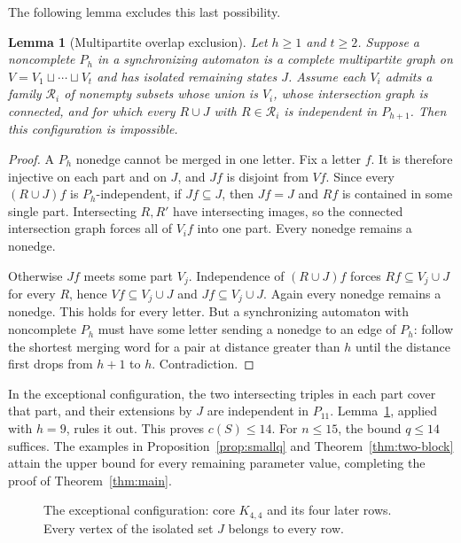 \documentclass[11pt]{article}
\newtheorem{lemma}[theorem]{Lemma}
\theoremstyle{definition}
\theoremstyle{plain}
\begin{document}
The following lemma excludes this last possibility.
\begin{lemma}[Multipartite overlap exclusion]\label{lem:multipartite}
Let $h\ge1$ and $t\ge2$. Suppose a noncomplete $P_h$ in a synchronizing automaton is a complete multipartite graph on $V=V_1\sqcup\cdots\sqcup V_t$ and has isolated remaining states $J$. Assume each $V_i$ admits a family $\mathcal R_i$ of nonempty subsets whose union is $V_i$, whose intersection graph is connected, and for which every $R\cup J$ with $R\in\mathcal R_i$ is independent in $P_{h+1}$. Then this configuration is impossible.
\end{lemma}
\begin{proof}
A $P_h$ nonedge cannot be merged in one letter. Fix a letter $f$. It is therefore injective on each part and on $J$, and $Jf$ is disjoint from $Vf$. Since every $(R\cup J)f$ is $P_h$-independent, if $Jf\subseteq J$, then $Jf=J$ and $Rf$ is contained in some single part. Intersecting $R,R'$ have intersecting images, so the connected intersection graph forces all of $V_if$ into one part. Every nonedge remains a nonedge.

Otherwise $Jf$ meets some part $V_j$. Independence of $(R\cup J)f$ forces $Rf\subseteq V_j\cup J$ for every $R$, hence $Vf\subseteq V_j\cup J$ and $Jf\subseteq V_j\cup J$. Again every nonedge remains a nonedge. This holds for every letter. But a synchronizing automaton with noncomplete $P_h$ must have some letter sending a nonedge to an edge of $P_h$: follow the shortest merging word for a pair at distance greater than $h$ until the distance first drops from $h+1$ to $h$. Contradiction.
\end{proof}

In the exceptional configuration, the two intersecting triples in each
part cover that part, and their extensions by $J$ are independent in
$P_{11}$. Lemma~\ref{lem:multipartite}, applied with $h=9$, rules it out.
This proves $c(S)\le14$. For $n\le15$, the bound $q\le14$ suffices.
The examples in Proposition~\ref{prop:smallq} and
Theorem~\ref{thm:two-block} attain the upper bound for every remaining
parameter value, completing the proof of Theorem~\ref{thm:main}.

\begin{figure}[htbp]\centering
{}
\caption{The exceptional configuration: core $K_{4,4}$ and its four later
rows. Every vertex of the isolated set $J$ belongs to every row.}
\label{fig:short-pair-cover}
\end{figure}
\end{document}
